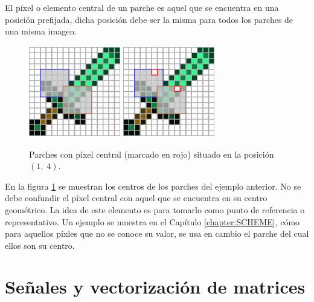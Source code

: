 \begin{definition}
	El p\'ixel o elemento central de un parche es aquel que se encuentra en una posici\'on prefijada, dicha posici\'on debe ser la misma para todos los parches de una misma imagen.
\end{definition}

\begin{figure}[h]
	\centering
	\includegraphics[width=4cm, height=4cm]{Graphics/diamon_sword_with_patches.png}
	\hspace{1cm}
	\includegraphics[width=4cm, height=4cm]{Graphics/diamon_sword_with_patches_and_centers.png}
	\caption{Parches con p\'ixel central (marcado en rojo) situado en la posici\'on $(1,\;4)$.}
	\label{ex:patch_center}
\end{figure}

En la figura \ref{ex:patch_center} se muestran los centros de los parches del ejemplo anterior. No se debe confundir el p\'ixel central con aquel que se encuentra en su centro geom\'etrico. La idea de este elemento es para tomarlo como punto de referencia o representativo. Un ejemplo se muestra en el Cap\'itulo \ref{chapter:SCHEME}, c\'omo para aquellos p\'ixles que no se conoce su valor, se usa en cambio el parche del cual ellos son su centro.

\section{Señales y vectorizaci\'on de matrices}\label{sec:signals}

